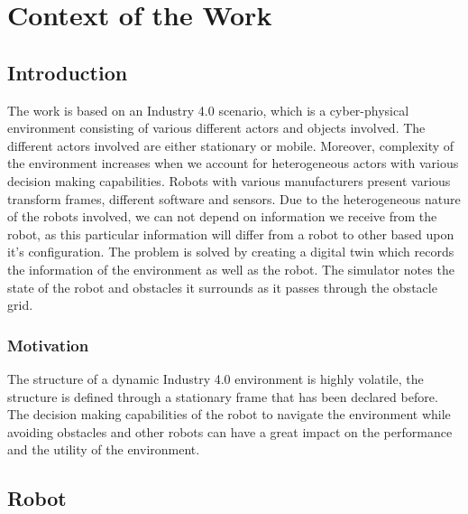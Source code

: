 \chapter{Context of the Work}

\label{Chapter1}

\section{Introduction}
The work is based on an Industry 4.0 scenario, which is a cyber-physical environment consisting of various different 
actors and objects involved. The different actors involved are either stationary or mobile. Moreover, complexity of the 
environment increases when we account for heterogeneous actors with various decision making capabilities. Robots with various
manufacturers present various transform frames, different software and sensors. Due to the heterogeneous nature of the robots 
involved, we can not depend on information we receive from the robot, as this particular information will differ from a robot 
to other based upon it's configuration. The problem is solved by creating a digital twin which records the information of the 
environment as well as the robot. The simulator notes the state of the robot and obstacles it surrounds as it passes 
through the obstacle grid. 

\subsection{Motivation}
The structure of a dynamic Industry 4.0 environment is highly volatile, the structure is defined through a stationary frame that 
has been declared before. The decision making capabilities of the robot to navigate the environment while avoiding obstacles and 
other robots can have a great impact on the performance and the utility of the environment. 
\section{Robot}
